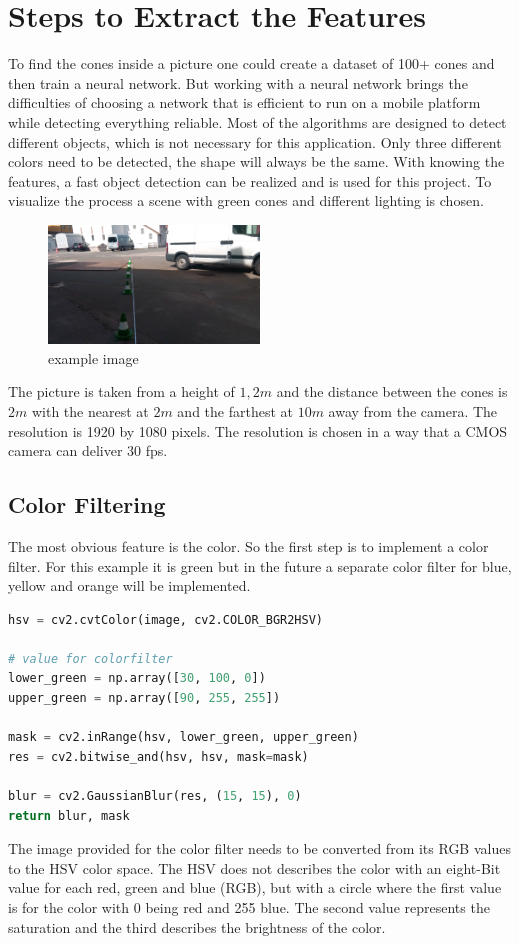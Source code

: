 \documentclass[10pt,a4paper]{article}
\begin{document}
	\section{Steps to Extract the Features}
	To find the cones inside a picture one could create a dataset of 100+ cones and then train a neural network. But working with a neural network brings the difficulties of choosing a network that is efficient to run on a mobile platform while detecting everything reliable.
	Most of the algorithms are designed to detect different objects, which is not necessary for this application. 
	Only three different colors need to be detected, the shape will always be the same. With knowing the features, a fast object detection can be realized and is used for this project.
	To visualize the process a scene with green cones and different lighting is chosen.
	\begin{figure}[h]
		\centering
		\includegraphics[width=0.5\textwidth]{Abb/start.png}
		\caption{example image}
		\label{example image}
	\end{figure}
	The picture is taken from a height of $1,2 m$ and the distance between the cones is $2m$ with the nearest at $2m$ and the farthest at $10m$ away from the camera. The resolution is 1920 by 1080 pixels. The resolution is chosen in a way that a CMOS camera can deliver 30 fps.
	 
	\subsection{Color Filtering}
	The most obvious feature is the color. So the first step is to implement a color filter. For this example it is green but in the future a separate color filter for blue, yellow and orange will be implemented.
	\begin{lstlisting}[language=Python]
hsv = cv2.cvtColor(image, cv2.COLOR_BGR2HSV)
	
# value for colorfilter
lower_green = np.array([30, 100, 0])
upper_green = np.array([90, 255, 255])
	
mask = cv2.inRange(hsv, lower_green, upper_green)
res = cv2.bitwise_and(hsv, hsv, mask=mask)

blur = cv2.GaussianBlur(res, (15, 15), 0)
return blur, mask
	\end{lstlisting}
	The image provided for the color filter needs to be converted from its RGB values to the HSV color space.
	The HSV does not describes the color with an eight-Bit value for each red, green and blue (RGB), but with a circle where the first value is for the color with 0 being red and 255 blue.
	The second value represents the saturation and the third describes the brightness of the color.
	
\end{document}
